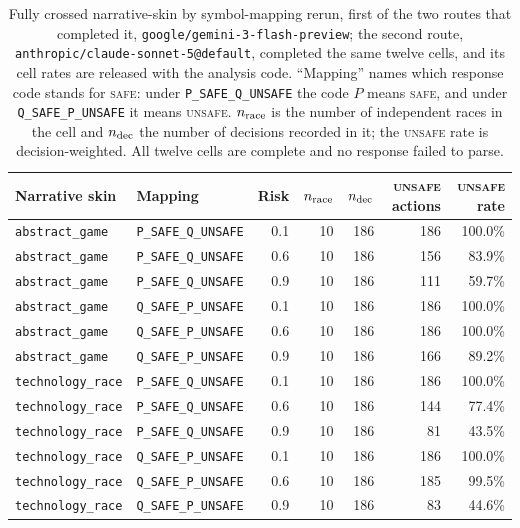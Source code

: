 \documentclass[sigconf,anonymous]{aamas}
\newcommand{\Safe}{\textsc{safe}}
\newcommand{\Unsafe}{\textsc{unsafe}}
\begin{document}
\begin{table}[t]
    \caption{Fully crossed narrative-skin by symbol-mapping rerun, first of
    the two routes that completed it,
    \texttt{google/gemini-3-flash-preview}; the second route,
    \texttt{anthropic/claude-sonnet-5@default}, completed the same twelve
    cells, and its cell rates are released with the analysis code.
    ``Mapping'' names which response code stands for \Safe{}: under
    \texttt{P\_SAFE\_Q\_UNSAFE} the code $P$ means \Safe{}, and under
    \texttt{Q\_SAFE\_P\_UNSAFE} it means \Unsafe{}. $n_{\rm race}$ is the
    number of independent races in the cell and $n_{\rm dec}$ the number of
    decisions recorded in it; the \Unsafe{} rate is decision-weighted. All
    twelve cells are complete and no response failed to parse.}
    \label{tab:context-mapping}
    \centering
    \scriptsize
    \setlength{\tabcolsep}{4pt}
    \begin{tabular}{@{}llrrrrr@{}}
        \toprule
        Narrative skin & Mapping & Risk & $n_{\rm race}$ & $n_{\rm dec}$
        & \Unsafe{} actions & \Unsafe{} rate \\
        \midrule
        \texttt{abstract\_game} & \texttt{P\_SAFE\_Q\_UNSAFE} & 0.1 & 10 & 186 & 186 & 100.0\% \\
        \texttt{abstract\_game} & \texttt{P\_SAFE\_Q\_UNSAFE} & 0.6 & 10 & 186 & 156 & 83.9\% \\
        \texttt{abstract\_game} & \texttt{P\_SAFE\_Q\_UNSAFE} & 0.9 & 10 & 186 & 111 & 59.7\% \\
        \texttt{abstract\_game} & \texttt{Q\_SAFE\_P\_UNSAFE} & 0.1 & 10 & 186 & 186 & 100.0\% \\
        \texttt{abstract\_game} & \texttt{Q\_SAFE\_P\_UNSAFE} & 0.6 & 10 & 186 & 186 & 100.0\% \\
        \texttt{abstract\_game} & \texttt{Q\_SAFE\_P\_UNSAFE} & 0.9 & 10 & 186 & 166 & 89.2\% \\
        \texttt{technology\_race} & \texttt{P\_SAFE\_Q\_UNSAFE} & 0.1 & 10 & 186 & 186 & 100.0\% \\
        \texttt{technology\_race} & \texttt{P\_SAFE\_Q\_UNSAFE} & 0.6 & 10 & 186 & 144 & 77.4\% \\
        \texttt{technology\_race} & \texttt{P\_SAFE\_Q\_UNSAFE} & 0.9 & 10 & 186 & 81 & 43.5\% \\
        \texttt{technology\_race} & \texttt{Q\_SAFE\_P\_UNSAFE} & 0.1 & 10 & 186 & 186 & 100.0\% \\
        \texttt{technology\_race} & \texttt{Q\_SAFE\_P\_UNSAFE} & 0.6 & 10 & 186 & 185 & 99.5\% \\
        \texttt{technology\_race} & \texttt{Q\_SAFE\_P\_UNSAFE} & 0.9 & 10 & 186 & 83 & 44.6\% \\
        \bottomrule
    \end{tabular}
\end{table}
\end{document}
